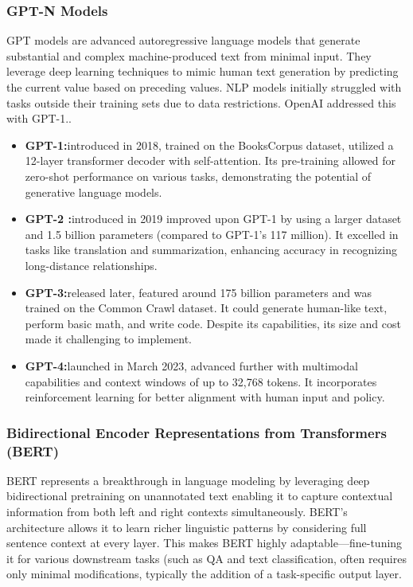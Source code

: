     \subsubsection{GPT-N Models}
	 GPT models are advanced autoregressive language models that generate substantial and complex machine-produced text from minimal input. They leverage deep learning techniques to mimic human text generation by predicting the current value based on preceding values.
	 NLP models initially struggled with tasks outside their training sets due to data restrictions. OpenAI addressed this with GPT-1.\citep{yenduri2023gpt}.
 \begin{itemize}
		\item \textbf{GPT-1:}introduced in 2018, trained on the BooksCorpus dataset, utilized a 12-layer transformer decoder with self-attention. Its pre-training allowed for zero-shot performance on various tasks, demonstrating the potential of generative language models.
		\item \textbf{GPT-2 :}introduced in 2019 improved upon GPT-1 by using a larger dataset and 1.5 billion parameters (compared to GPT-1’s 117 million). It excelled in tasks like translation and summarization, enhancing accuracy in recognizing long-distance relationships.
		\item \textbf{GPT-3:}released later, featured around 175 billion parameters and was trained on the Common Crawl dataset. It could generate human-like text, perform basic math, and write code. Despite its capabilities, its size and cost made it challenging to implement.
		\item \textbf{GPT-4:}launched in March 2023, advanced further with multimodal capabilities and context windows of up to 32,768 tokens. It incorporates reinforcement learning for better alignment with human input and policy.
	 \end{itemize}
	 
	\subsubsection{Bidirectional Encoder Representations from Transformers (BERT)}
	 BERT represents a breakthrough in language modeling by leveraging deep bidirectional pretraining on unannotated text enabling it to capture contextual information from both left and right contexts simultaneously. BERT's architecture allows it to learn richer linguistic patterns by considering full sentence context at every layer. This makes BERT highly adaptable—fine-tuning it for various downstream tasks (such as QA and text classification, often requires only minimal modifications, typically the addition of a task-specific output layer.
	 
